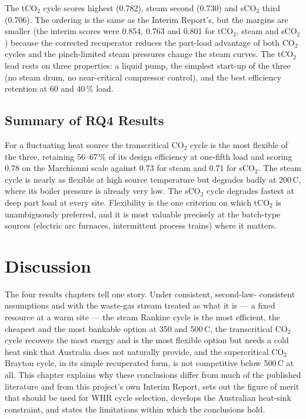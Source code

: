 \documentclass[12pt,a4paper]{report}
\begin{document}
The tCO$_2$ cycle scores highest (0.782), steam second (0.730) and sCO$_2$
third (0.706). The ordering is the same as the Interim Report's, but the
margins are smaller (the interim scores were 0.854, 0.763 and 0.801 for
tCO$_2$, steam and sCO$_2$) because the corrected recuperator reduces the
part-load advantage of both CO$_2$ cycles and the pinch-limited steam
pressures change the steam curves. The tCO$_2$ lead rests on three
properties: a liquid pump, the simplest start-up of the three (no steam drum,
no near-critical compressor control), and the best efficiency retention at
60 and 40\,\% load.

\section{Summary of RQ4 Results}
\label{sec:rq4_summary}

For a fluctuating heat source the transcritical CO$_2$ cycle is the most
flexible of the three, retaining 56--67\,\% of its design efficiency at
one-fifth load and scoring 0.78 on the Marchionni scale against 0.73 for
steam and 0.71 for sCO$_2$. The steam cycle is nearly as flexible at high
source temperature but degrades badly at 200\,\textdegree C, where its boiler
pressure is already very low. The sCO$_2$ cycle degrades fastest at deep
part load at every site. Flexibility is the one criterion on which tCO$_2$
is unambiguously preferred, and it is most valuable precisely at the
batch-type sources (electric arc furnaces, intermittent process trains)
where it matters.
\chapter{Discussion}
\label{ch:discussion}

The four results chapters tell one story. Under consistent, second-law-
consistent assumptions and with the waste-gas stream treated as what it
is --- a fixed resource at a warm site --- the steam Rankine cycle is the
most efficient, the cheapest and the most bankable option at 350 and
500\,\textdegree C, the transcritical CO$_2$ cycle recovers the most energy
and is the most flexible option but needs a cold heat sink that Australia
does not naturally provide, and the supercritical CO$_2$ Brayton cycle, in
its simple recuperated form, is not competitive below 500\,\textdegree C at
all. This chapter explains why these conclusions differ from much of the
published literature and from this project's own Interim Report, sets out
the figure of merit that should be used for WHR cycle selection, develops
the Australian heat-sink constraint, and states the limitations within which
the conclusions hold.
\end{document}
